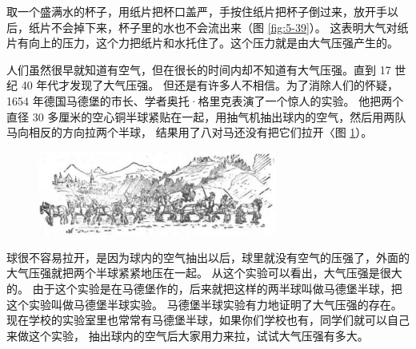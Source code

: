 取一个盛满水的杯子，用纸片把杯口盖严，手按住纸片把杯子倒过来，放开手以后，纸片不会掉下来，杯子里的水也不会流出来（图 \ref{fig:5-39}）。
这表明大气对纸片有向上的压力，这个力把纸片和水托住了。这个压力就是由大气压强产生的。

人们虽然很早就知道有空气，但在很长的时间内却不知道有大气压强。直到 17 世纪 40 年代才发现了大气压强。
但还是有许多人不相信。为了消除人们的怀疑，1654 年德国马德堡的市长、学者奥托·格里克表演了一个惊人的实验。
他把两个直径 30 多厘米的空心铜半球紧贴在一起，用抽气机抽出球内的空气，然后用两队马向相反的方向拉两个半球，
结果用了八对马还没有把它们拉开〈图 \ref{fig:5-40}）。
\begin{figure}[htbp]
    \centering
    \includegraphics[width=0.7\textwidth]{../pic/czwl1-ch5-40}
    \caption{}\label{fig:5-40}
\end{figure}
球很不容易拉开，是因为球内的空气抽出以后，球里就没有空气的压强了，外面的大气压强就把两个半球紧紧地压在一起。
从这个实验可以看出，大气压强是很大的。
由于这个实验是在马德堡作的，后来就把这样的两半球叫做马德堡半球，把这个实验叫做马德堡半球实验。
马德堡半球实验有力地证明了大气压强的存在。
现在学校的实验室里也常常有马德堡半球，如果你们学校也有，同学们就可以自己来做这个实验，
抽出球内的空气后大家用力来拉，试试大气压强有多大。


